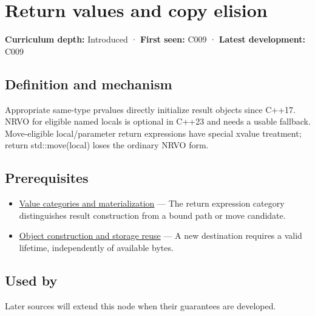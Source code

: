 \hypertarget{appendix-b08d3788c5c6}{}\label{referencestart:appendix-b08d3788c5c6}
\section{Return values and copy elision}\label{appendix-b08d3788c5c6-return-values-and-copy-elision}

\textbf{Curriculum depth:} Introduced · \textbf{First seen:} C009 · \textbf{Latest development:} C009

\begin{allmightroledefinition}

\subsection{Definition and mechanism}\label{appendix-b08d3788c5c6-definition-and-mechanism}

Appropriate same-type prvalues directly initialize result objects since C++17. NRVO for eligible named locals is optional in C++23 and needs a usable fallback. Move-eligible local/parameter return expressions have special xvalue treatment; return std::move(local) loses the ordinary NRVO form.

\end{allmightroledefinition}

\subsection{Prerequisites}\label{appendix-b08d3788c5c6-prerequisites}

\begin{itemize}
\tightlist
\item
  \hyperref[appendix-1121b30eaeb0]{Value categories and materialization} --- The return expression category distinguishes result construction from a bound path or move candidate.
\item
  \hyperref[appendix-a82f9c438857]{Object construction and storage reuse} --- A new destination requires a valid lifetime, independently of available bytes.
\end{itemize}

\subsection{Used by}\label{appendix-b08d3788c5c6-used-by}

Later sources will extend this node when their guarantees are developed.

